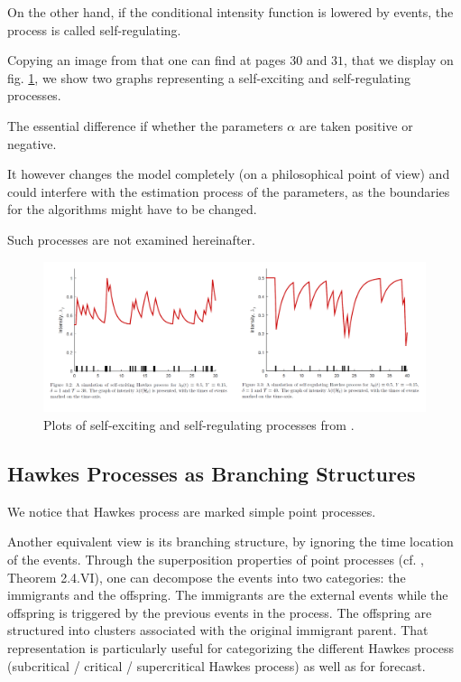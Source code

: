 On the other hand, if the conditional intensity function is lowered by events, the process is called self-regulating. 

Copying an image from \cite{obral} that one can find at pages $30$ and $31$, that we display on fig. \ref{fig:obral}, we show two graphs representing a self-exciting and self-regulating processes. 

The essential difference if whether the parameters $\alpha$ are taken positive or negative. 

It however changes the model completely (on a philosophical point of view) and could interfere with the estimation process of the parameters, as the boundaries for the algorithms might have to be changed.

Such processes are not examined hereinafter.

\begin{figure}
\centering
\includegraphics[width = 0.90 \textwidth]{../imag/chap1/obral.png}
\caption{ Plots of self-exciting and self-regulating processes from \cite{obral}.}
\label{fig:obral}
\end{figure}












\subsection{Hawkes Processes as Branching Structures}
We notice that Hawkes process are marked simple point processes.

Another equivalent view is its branching structure, by ignoring the time location of the events. Through the superposition
properties of point processes (cf. \cite{daley}, Theorem 2.4.VI), one can decompose the events into two categories: the immigrants and the offspring. The immigrants are the external events while the offspring is triggered by the previous events in the process. The offspring are structured into clusters associated with the original immigrant parent. That representation is particularly useful for categorizing the different Hawkes process (subcritical / critical / supercritical Hawkes process) as well as for forecast.

